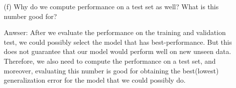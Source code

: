 \documentclass[12pt,letterpaper]{article}
\begin{document}
\begin{itemize}
    \item[(f)]Why do we compute performance on a test set as well? What is this number good for?
    
    Anwser: After we evaluate the performance on the training and validation test, we could possibly select the model that has best-performance. But this does not guarantee that our model would perform well on new unseen data. Therefore, we also need to compute the performance on a test set, and moreover, evaluating this number is good for obtaining the best(lowest) generalization error for the model that we could possibly do.
\end{itemize}
\end{document}
